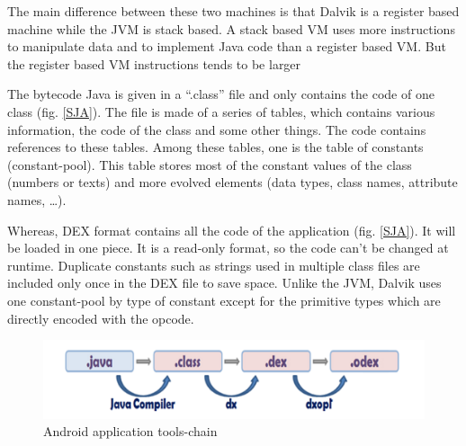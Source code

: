 \documentclass{sigplanconf}
\def \DALVIK{\mbox{Dalvik}\xspace}
\def \ANDROID{\mbox{Android}\xspace}
\def \JVM{\ac{JVM}\xspace}
\def \DEX{\mbox{DEX}\xspace}
\begin{document}
      The main difference between these two machines is that \DALVIK is a register based machine while the \JVM is stack based.
      A stack based VM uses more instructions to manipulate data and to implement Java code than a register based VM.
      But the register based VM instructions tends to be larger \cite{ieee-paul-kundu-energy-perspective}

      The bytecode Java is given in a ``.class'' file and only contains the code of one class (fig. \ref{SJA}).
      The file is made of a series of tables, which contains various information, the code of the class and some other things.
      The code contains references to these tables.
      Among these tables, one is the table of constants (constant-pool).
      This table stores most of the constant values of the class (numbers or texts)
      and more evolved elements (data types, class names, attribute names, \dots).

      Whereas, \DEX format contains all the code of the application (fig. \ref{SJA}).
      It will be loaded in one piece.
      It is a read-only format, so the code can't be changed at runtime.
      Duplicate constants such as strings used in multiple class files
      are included only once in the \DEX file to save space.
      Unlike the \JVM, \DALVIK uses one constant-pool by type of constant
      except for the primitive types which are directly encoded with the opcode.\\

      \begin{figure}[h]
        \centering
        \includegraphics[width=\columnwidth]{dex-tools-chain.png}
        \caption{\ANDROID application tools-chain}
        \label{DTC}
      \end{figure}
\end{document}
